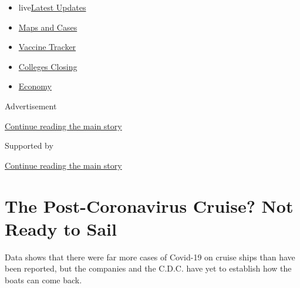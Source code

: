 \begin{itemize}
\tightlist
\item
  live\href{https://www.nytimes3xbfgragh.onion/2020/08/20/world/coronavirus-covid.html?name=styln-coronavirus-national\&region=TOP_BANNER\&variant=undefined\&block=storyline_menu_recirc\&action=click\&pgtype=Article\&impression_id=32182f31-e386-11ea-941b-313b39d5e3bc}{Latest
  Updates}
\item
  \href{https://www.nytimes3xbfgragh.onion/interactive/2020/us/coronavirus-us-cases.html?name=styln-coronavirus-national\&region=TOP_BANNER\&variant=undefined\&block=storyline_menu_recirc\&action=click\&pgtype=Article\&impression_id=32182f32-e386-11ea-941b-313b39d5e3bc}{Maps
  and Cases}
\item
  \href{https://www.nytimes3xbfgragh.onion/interactive/2020/science/coronavirus-vaccine-tracker.html?name=styln-coronavirus-national\&region=TOP_BANNER\&variant=undefined\&block=storyline_menu_recirc\&action=click\&pgtype=Article\&impression_id=32182f33-e386-11ea-941b-313b39d5e3bc}{Vaccine
  Tracker}
\item
  \href{https://www.nytimes3xbfgragh.onion/2020/08/19/us/colleges-closing-covid.html?name=styln-coronavirus-national\&region=TOP_BANNER\&variant=undefined\&block=storyline_menu_recirc\&action=click\&pgtype=Article\&impression_id=32182f34-e386-11ea-941b-313b39d5e3bc}{Colleges
  Closing}
\item
  \href{https://www.nytimes3xbfgragh.onion/live/2020/08/20/business/stock-market-today-coronavirus?name=styln-coronavirus-national\&region=TOP_BANNER\&variant=undefined\&block=storyline_menu_recirc\&action=click\&pgtype=Article\&impression_id=32182f35-e386-11ea-941b-313b39d5e3bc}{Economy}
\end{itemize}

Advertisement

\protect\hyperlink{after-top}{Continue reading the main story}

Supported by

\protect\hyperlink{after-sponsor}{Continue reading the main story}

\hypertarget{the-post-coronavirus-cruise-not-ready-to-sail}{%
\section{The Post-Coronavirus Cruise? Not Ready to
Sail}\label{the-post-coronavirus-cruise-not-ready-to-sail}}

Data shows that there were far more cases of Covid-19 on cruise ships
than have been reported, but the companies and the C.D.C. have yet to
establish how the boats can come back.

